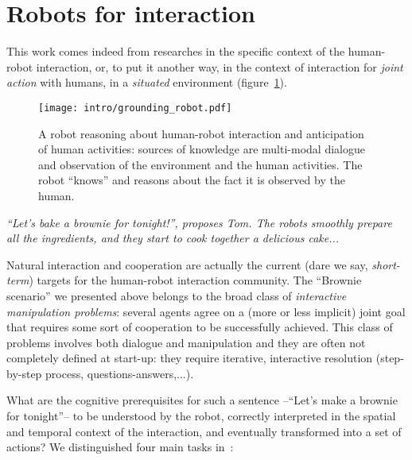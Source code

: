 
\section{Robots for interaction}
\label{sect|hri-context}

This work comes indeed from researches in the specific context of the
human-robot interaction, or, to put it another way, in the context of
interaction for \emph{joint action} with humans,  in a \emph{situated}
environment (figure~\ref{fig|hri-dec}).


\begin{figure}
    \centering
    \texttt{[image: intro/grounding\_robot.pdf]}
    
    \caption{A robot reasoning about human-robot interaction and anticipation
    of human activities: sources of knowledge are multi-modal dialogue and
    observation of the environment and the human activities. The robot ``knows''
    and reasons about the fact it is observed by the human.}

    \label{fig|hri-dec}
\end{figure}



{\em ``\emph{Let's bake a brownie for tonight!}'', proposes Tom. The robots
smoothly prepare all the ingredients, and they start to cook together a
delicious cake...}

Natural interaction and cooperation are actually the current (dare we say,
\emph{short-term}) targets for the human-robot interaction community.  The
``Brownie scenario'' we presented above belongs to the broad class of
\emph{interactive manipulation problems}: several agents agree on a (more or
less implicit) joint goal that requires some sort of cooperation to be
successfully achieved. This class of problems involves both dialogue and
manipulation and they are often not completely defined at start-up: they require
iterative, interactive resolution (step-by-step process,
questions-answers,...).

What are the cognitive prerequisites for such a sentence --``Let's make a
brownie for tonight''-- to be understood by the robot, correctly interpreted in
the spatial and temporal context of the interaction, and eventually transformed
into a set of actions? We distinguished four main tasks in~\cite{Lemaignan2012}:

